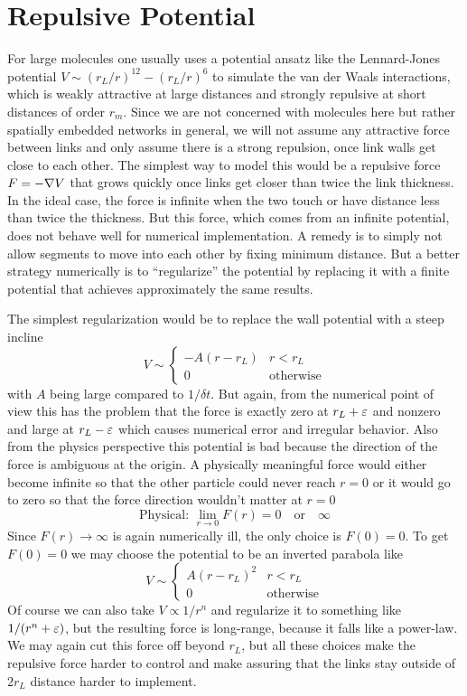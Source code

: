 \documentclass[nofootinbib,preprint,floatfix,titlepage,endfloats,superscriptaddress]{revtex4} %
\begin{document}
\section{Repulsive Potential\label{ap:repel}}

For large molecules one usually uses a potential ansatz like the Lennard-Jones potential $V \sim (r_L/r)^{12} - (r_L/r)^6 $ to simulate the van der Waals interactions, which is weakly attractive at large distances and strongly repulsive at short distances of order $r_m$. Since we are not concerned with molecules here but rather spatially embedded networks in general, we will not assume any attractive force between links and only assume there is a strong repulsion, once link walls get close to each other. The simplest way to model this would be a repulsive force $F = -\nabla V$ that grows quickly once links get closer than twice the link thickness. In the ideal case, the force is infinite when the two touch or have distance less than twice the thickness. But this force, which comes from an infinite potential, does not behave well for numerical implementation. A remedy is to simply not allow segments to move into each other by fixing minimum distance. But a better strategy numerically is to ``regularize'' the potential by replacing it with a finite potential that achieves approximately the same results. 

The simplest regularization would be to replace the wall potential with a steep incline
\[V \sim \begin{cases} -A(r -r_L) & r< r_L \\
0 & \mbox{otherwise} 
\end{cases}\]
with $A$ being large compared to $1/\delta t$. 
But again, from the numerical point of view this has the problem that the force is exactly zero at $r_L+\varepsilon$ and nonzero and large at $r_L - \varepsilon$ which causes numerical error and irregular behavior. Also from the physics perspective this potential is bad because the direction of the force is ambiguous at the origin. A physically meaningful force would either become infinite so that the other particle could never reach $r=0$ or it would go to zero so that the force direction wouldn't matter at $r=0$
\[\mbox{Physical: } \lim_{r\to 0} F(r) = 0 \quad \mbox{or}\quad \infty \]
Since $F(r)\to \infty$ is again numerically ill, the only choice is $F(0) = 0$. To get $F(0) = 0$ we may choose the potential to be an inverted parabola like
\[V \sim \begin{cases} A(r -r_L)^2 & r< r_L \\
0 & \mbox{otherwise} 
\end{cases}\]
Of course we can also take $V\propto 1/r^n$ 
and regularize it to something like $1/(r^n+\varepsilon)$, but the resulting force is long-range, because it falls like a power-law. We may again cut this force off beyond $r_L$, but all these choices make the repulsive force harder to control and make assuring that the links stay outside of $2r_L$ distance harder to implement. 
\end{document}
